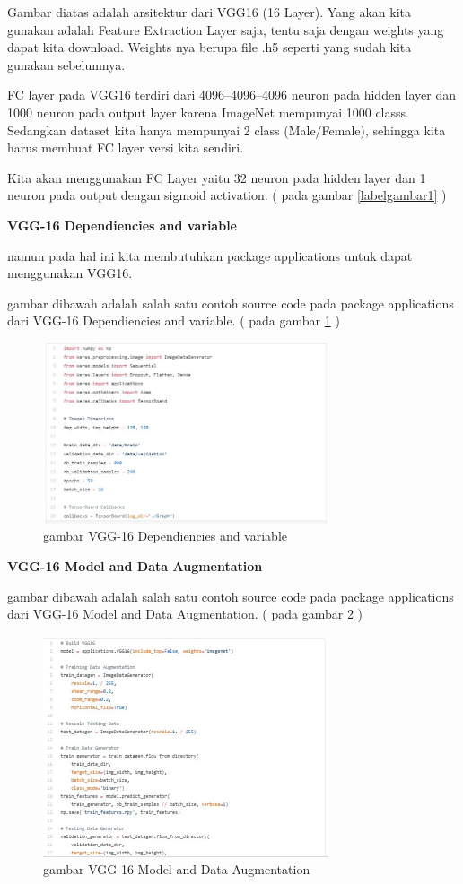 Gambar diatas adalah arsitektur dari VGG16 (16 Layer). Yang akan kita gunakan adalah Feature Extraction Layer saja, tentu saja dengan weights yang dapat kita download. Weights nya berupa file .h5 seperti yang sudah kita gunakan sebelumnya.

FC layer pada VGG16 terdiri dari 4096–4096–4096 neuron pada hidden layer dan 1000 neuron pada output layer karena ImageNet mempunyai 1000 classs. Sedangkan dataset kita hanya mempunyai 2 class (Male/Female), sehingga kita harus membuat FC layer versi kita sendiri.

Kita akan menggunakan FC Layer yaitu 32 neuron pada hidden layer dan 1 neuron pada output dengan sigmoid activation.
( pada gambar \ref{labelgambar1} )

\textbf{VGG-16 Dependiencies and variable} 

namun pada hal ini kita membutuhkan package applications untuk dapat menggunakan VGG16.

gambar dibawah adalah salah satu contoh source code pada package applications dari VGG-16 Dependiencies and variable.
( pada gambar \ref{labelgambar2} )
\begin{figure}[!htp]
	\includegraphics[width=0.75\textwidth]{figures/vgg1.jpeg}
	\caption{gambar VGG-16 Dependiencies and variable}
	\label{labelgambar2}
\end{figure}

\textbf{VGG-16 Model and Data Augmentation}

gambar dibawah adalah salah satu contoh source code pada package applications dari VGG-16 Model and Data Augmentation.
( pada gambar \ref{labelgambar3} )
\begin{figure}[!htp]
	\includegraphics[width=0.75\textwidth]{figures/vgg2.JPG}
	\caption{gambar VGG-16 Model and Data Augmentation}
	\label{labelgambar3}
\end{figure}

